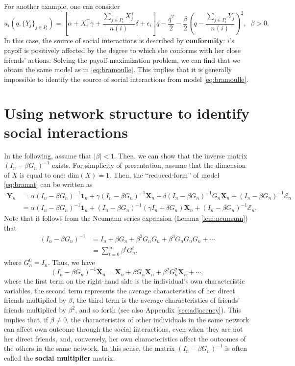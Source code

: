 \documentclass[10.5pt, A4paper, openany, uplatex]{book}
\newcommand{\mbf}{\mathbf}
\newcommand{\mcl}{\mathcal}
\newcommand{\mrm}{\mathrm}
\numberwithin{equation}{section}
\begin{document}
For another example, one can consider
\begin{equation*}
u_i(q, \{Y_j\}_{j \in P_i})=\left[ \alpha + X_i^\top \gamma +  \frac{\sum_{j \in P_i} X_j^\top}{n(i)} \delta + \epsilon_i  \right] q -\frac{q^{2}}{2} -\frac{\beta}{2} \left( q - \dfrac{\sum_{j \in P_i} Y_j}{n(i)} \right)^2, \;\; \beta > 0.
\end{equation*}
In this case, the source of social interactions is described by \textbf{conformity}: $i$'s payoff is positively affected by the degree to which she conforms with her close friends' actions. 
Solving the payoff-maximization problem, we can find that we obtain the same model as in \eqref{eq:bramoulle}.
This implies that it is generally impossible to identify the source of social interactions from model \eqref{eq:bramoulle}. 

\section{Using network structure to identify social interactions}

In the following, assume that $|\beta| < 1$.
Then, we can show that the inverse matrix $(I_n - \beta G_n)^{-1}$ exists.
For simplicity of presentation, assume that the dimension of $X$ is equal to one: $\mrm{dim}(X) = 1$.
Then, the ``reduced-form'' of model \eqref{eq:bramat} can be written as
\begin{align*}
	\mbf{Y}_n 
	& = \alpha (I_n - \beta G_n)^{-1}\mathbf{1}_n  + \gamma (I_n - \beta G_n)^{-1}\mbf{X}_n  + \delta (I_n - \beta G_n)^{-1} G_n \mbf{X}_n + (I_n - \beta G_n)^{-1}\mcl{E}_n\\
	& =  \alpha (I_n - \beta G_n)^{-1}\mathbf{1}_n  + (I_n - \beta G_n)^{-1}( \gamma I_n + \delta G_n ) \mbf{X}_n + (I_n - \beta G_n)^{-1}\mcl{E}_n.
\end{align*}
Note that it follows from the Neumann series expansion (Lemma \ref{lem:neumann}) that 
\begin{align*}
	 (I_n - \beta G_n)^{-1} 
	& = I_n + \beta G_n + \beta^2 G_n G_n + \beta^3 G_n G_n G_n + \cdots \\
	&= \sum_{t = 0}^\infty \beta^t G_n^t,
\end{align*}
where $G_n^0 = I_n$.
Thus, we have 
\[
	(I_n - \beta G_n)^{-1}\mbf{X}_n = \mbf{X}_n + \beta G_n \mbf{X}_n + \beta^2 G_n^2\mbf{X}_n + \cdots,
\]
where the first term on the right-hand side is the individual's own characteristic variables, the second term represents the average characteristics of her direct friends multiplied by $\beta$, the third term is the average characteristics of friends' friends multiplied by $\beta^2$, and so forth (see also Appendix \ref{sec:adjacency}).
This implies that, if $\beta \neq 0$, the characteristics of other individuals in the same network can affect own outcome through the social interactions, even when they are not her direct friends, and, conversely, her own characteristics affect the outcomes of the others in the same network.
In this sense, the matrix $(I_n - \beta G_n)^{-1} $ is often called the \textbf{social multiplier} matrix.
\end{document}
